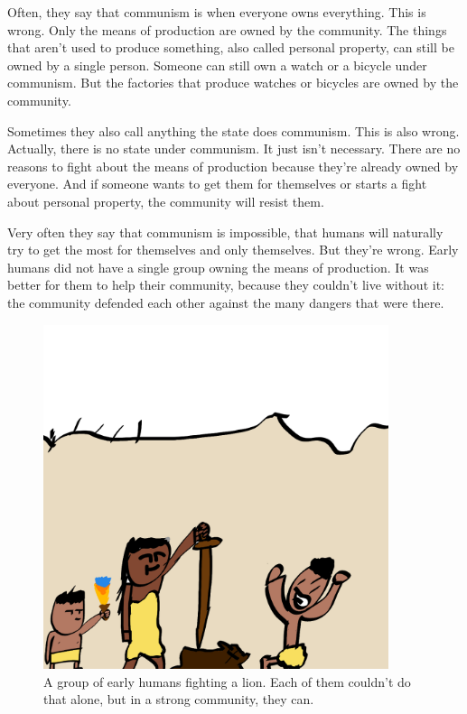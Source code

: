 \documentclass[a4paper]{book} %
\begin{document}
Often, they say that communism is when everyone owns everything. This is wrong. Only the means of production are owned by the community. The things that aren't used to produce something, also called personal property, can still be owned by a single person. Someone can still own a watch or a bicycle under communism. But the factories that produce watches or bicycles are owned by the community.

Sometimes they also call anything the state does communism. This is also wrong. Actually, there is no state under communism. It just isn't necessary. There are no reasons to fight about the means of production because they're already owned by everyone. And if someone wants to get them for themselves or starts a fight about personal property, the community will resist them.

Very often they say that communism is impossible, that humans will naturally try to get the most for themselves and only themselves. But they're wrong. Early humans did not have a single group owning the means of production. It was better for them to help their community, because they couldn't live without it: the community defended each other against the many dangers that were there.

\begin{figure}[tbhp]
\centering
\includegraphics[width=0.9\textwidth]{1-2.png}
\caption{A group of early humans fighting a lion. Each of them couldn't do that alone, but in a strong community, they can.}
\end{figure}
\end{document}
